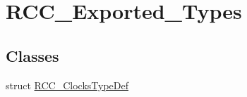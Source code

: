 \hypertarget{group__RCC__Exported__Types}{
\section{RCC\_\-Exported\_\-Types}
\label{group__RCC__Exported__Types}
}
\subsection*{Classes}
\begin{DoxyCompactItemize}
\item 
struct \hyperlink{structRCC__ClocksTypeDef}{RCC\_\-ClocksTypeDef}
\end{DoxyCompactItemize}
